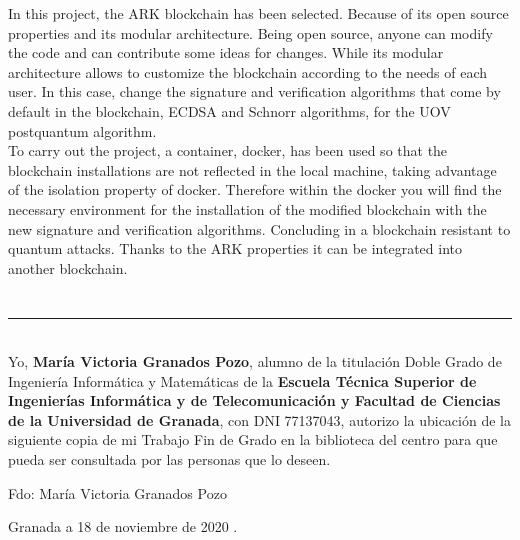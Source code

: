 In this project, the ARK blockchain has been selected. Because of its open source properties and its modular architecture. Being open source, anyone can modify the code and can contribute some ideas for changes. While its modular architecture allows to customize the blockchain according to the needs of each user. In this case, change the signature and verification algorithms that come by default in the blockchain, ECDSA and Schnorr algorithms, for the UOV postquantum algorithm.\\

To carry out the project, a container, docker, has been used so that the blockchain installations are not reflected in the local machine, taking advantage of the isolation property of docker. Therefore within the docker you will find the necessary environment for the installation of the modified blockchain with the new signature and verification algorithms. Concluding in a blockchain resistant to quantum attacks. Thanks to the ARK properties it can be integrated into another blockchain.\\




\chapter*{}
\thispagestyle{empty}

\noindent\rule[-1ex]{\textwidth}{2pt}\\[4.5ex]

Yo, \textbf{María Victoria Granados Pozo}, alumno de la titulación Doble Grado de Ingeniería Informática y Matemáticas de la \textbf{Escuela Técnica Superior
de Ingenierías Informática y de Telecomunicación y Facultad de Ciencias de la Universidad de Granada}, con DNI 77137043, autorizo la
ubicación de la siguiente copia de mi Trabajo Fin de Grado en la biblioteca del centro para que pueda ser
consultada por las personas que lo deseen.

\vspace{6cm}

\noindent Fdo: María Victoria Granados Pozo

\vspace{2cm}

\begin{flushright}
Granada a 18 de noviembre de 2020 .
\end{flushright}


\chapter*{}
\thispagestyle{empty}

